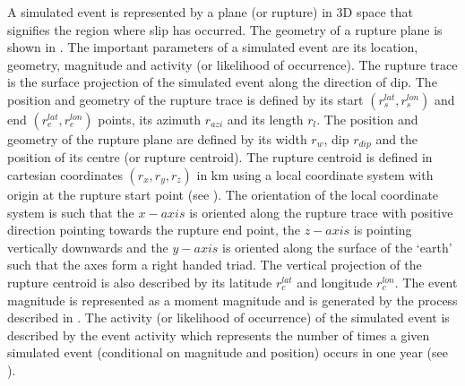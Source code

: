 A simulated event is represented by a plane
(or rupture) in 3D space that signifies the region where slip has
occurred. The geometry of a rupture plane is shown in
. The important parameters of a simulated
event are its location, geometry, magnitude
and activity (or likelihood of occurrence). The rupture trace is
the surface projection of the simulated event along the direction of dip. The position and geometry of
the rupture trace is defined by its start $(r_s^{lat},r_s^{lon})$
and end $(r_e^{lat},r_e^{lon})$ points, its azimuth $r_{azi}$ and
its length $r_l$. The position and geometry of the rupture plane
are defined by its width $r_w$, dip $r_{dip}$ and the position of
its centre (or rupture centroid). The rupture centroid is defined
in cartesian coordinates $(r_x,r_y,r_z)$ in km using a local
coordinate system with origin at the rupture start point (see
). The orientation of the local coordinate
system is such that the $x-axis$ is oriented along the rupture
trace with positive direction pointing towards the rupture end
point, the $z-axis$ is pointing vertically downwards and the
$y-axis$ is oriented along the surface of the `earth' such that
the axes form a right handed triad. The vertical projection of the
rupture centroid is also described by its latitude $r_c^{lat}$ and
longitude $r_c^{lon}$. The event magnitude is represented as a
moment magnitude and is generated by the process described in
. The activity (or likelihood of
occurrence) of the simulated event is
described by the event activity which represents the number of
times a given simulated event (conditional
on magnitude and position) occurs in one year (see
).

